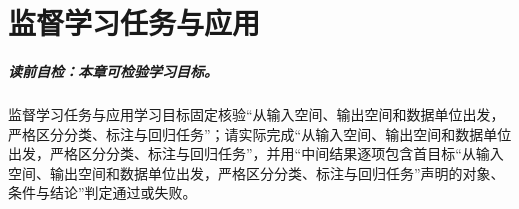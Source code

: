 
\chapter{监督学习任务与应用}\label{chap:V1-C11}


\label{struct:V1-C11-CH01}
\paragraph{读前自检：本章可检验学习目标。}监督学习任务与应用学习目标固定核验“从输入空间、输出空间和数据单位出发，严格区分分类、标注与回归任务”；请实际完成“从输入空间、输出空间和数据单位出发，严格区分分类、标注与回归任务”，并用“中间结果逐项包含首目标“从输入空间、输出空间和数据单位出发，严格区分分类、标注与回归任务”声明的对象、条件与结论”判定通过或失败。\par

